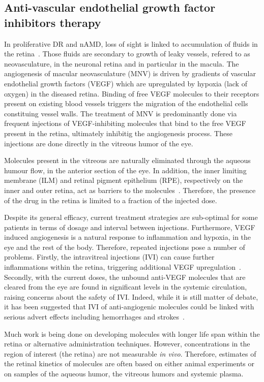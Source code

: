 \documentclass[11pt,a4paper]{article}
\begin{document}
\subsection{Anti-vascular endothelial growth factor inhibitors therapy}

In proliferative DR and nAMD, loss of sight is linked to accumulation of fluids in the retina~\cite{Roberts_2020, Waldstein_2016}.
Those fluids are secondary to growth of leaky vessels, refered to as neovasculature, in the neuronal retina and in particular in the macula.
The angiogenesis of macular neovasculature (MNV) is driven by gradients of vascular endothelial growth factors (VEGF) which are upregulated by hypoxia (lack of oxygen) in the diseased retina.
Binding of free VEGF molecules to their receptors present on existing blood vessels triggers the migration of the endothelial cells constituing vessel walls.
The treatment of MNV is predominantly done via frequent injections of VEGF-inhibiting molecules that bind to the free VEGF present in the retina, ultimately inhibitig the angiogenesis process.
These injections are done directly in the vitreous humor of the eye.

Molecules present in the vitreous are naturally eliminated through the aqueous humour flow, in the anterior section of the eye.
In addition, the inner limiting membrane (ILM) and retinal pigment epithelium (RPE), respectively on the inner and outer retina, act as barriers to the molecules~\cite{park_intraocular_2015}.
Therefore, the presence of the drug in the retina is limited to a fraction of the injected dose.

Despite its general efficacy, current treatment strategies are sub-optimal for some patients in terms of dosage and interval between injections.
Furthermore, VEGF induced angiogenesis is a natural response to inflammation and hypoxia, in the eye and the rest of the body. 
Therefore, repeated injections pose a number of problems.
Firstly, the intravitreal injections (IVI) can cause further inflammations within the retina, triggering additional VEGF upregulation~\cite{Iyer2022}.
Secondly, with the current doses, the unbound anti-VEGF molecules that are cleared from the eye are found in significant levels in the systemic circulation, raising concerns about the safety of IVI.
Indeed, while it is still matter of debate, it has been suggested that IVI of anti-angiogenic molecules could be linked with serious advert effects including hemorrhages and strokes~\cite{Avery2016, Maloney2021}.

Much work is being done on developing molecules with longer life span within the retina or alternative administration techniques.
However, concentrations in the region of interest (the retina) are not measurable \textit{in vivo}.
Therefore, estimates of the retinal kinetics of molecules are often based on either animal experiments or on samples of the aqueous humor, the vitreous humors and systemic plasma.
\end{document}
